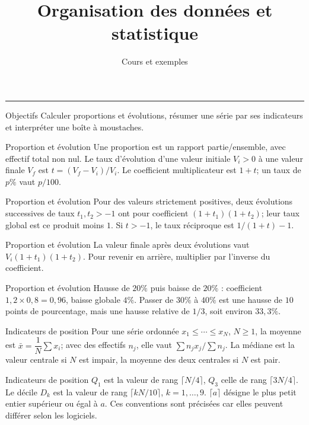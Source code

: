 \documentclass[aspectratio=169,10pt]{beamer}
\title{Organisation des données et statistique}
\subtitle{Cours et exemples}
\date{}
\author{}
\begin{document}
\begin{frame}[plain]
\vfill
{\inserttitle\par}
\medskip
{\insertsubtitle\par}
\medskip
{\rule{\textwidth}{.5pt}}
\vfill
\end{frame}
\begin{frame}{Objectifs}
Calculer proportions et évolutions, résumer une série par ses indicateurs et interpréter une boîte à moustaches.
\end{frame}
\begin{frame}{Proportion et évolution}
Une proportion est un rapport partie/ensemble, avec effectif total non nul. Le taux d’évolution d’une valeur initiale \(V_i>0\) à une valeur finale \(V_f\) est \(t=(V_f-V_i)/V_i\). Le coefficient multiplicateur est \(1+t\); un taux de \(p\%\) vaut \(p/100\).
\end{frame}
\begin{frame}{Proportion et évolution}
Pour des valeurs strictement positives, deux évolutions successives de taux \(t_1,t_2>-1\) ont pour coefficient \((1+t_1)(1+t_2)\); leur taux global est ce produit moins \(1\). Si \(t>-1\), le taux réciproque est \(1/(1+t)-1\).
\end{frame}
\begin{frame}{Proportion et évolution}
La valeur finale après deux évolutions vaut \(V_i(1+t_1)(1+t_2)\). Pour revenir en arrière, multiplier par l’inverse du coefficient.
\end{frame}
\begin{frame}{Proportion et évolution}
Hausse de \(20\%\) puis baisse de \(20\%\) : coefficient \(1{,}2\times0{,}8=0{,}96\), baisse globale \(4\%\). Passer de \(30\%\) à \(40\%\) est une hausse de \(10\) points de pourcentage, mais une hausse relative de \(1/3\), soit environ \(33{,}3\%\).
\end{frame}
\begin{frame}{Indicateurs de position}
Pour une série ordonnée \(x_1\le\cdots\le x_N\), \(N\ge1\), la moyenne est \(\bar x=\dfrac1N\sum x_i\); avec des effectifs \(n_j\), elle vaut \(\sum n_jx_j/\sum n_j\). La médiane est la valeur centrale si \(N\) est impair, la moyenne des deux centrales si \(N\) est pair.
\end{frame}
\begin{frame}{Indicateurs de position}
\(Q_1\) est la valeur de rang \(\lceil N/4\rceil\), \(Q_3\) celle de rang \(\lceil3N/4\rceil\). Le décile \(D_k\) est la valeur de rang \(\lceil kN/10\rceil\), \(k=1,\ldots,9\). \(\lceil a\rceil\) désigne le plus petit entier supérieur ou égal à \(a\). Ces conventions sont précisées car elles peuvent différer selon les logiciels.
\end{frame}
\end{document}
